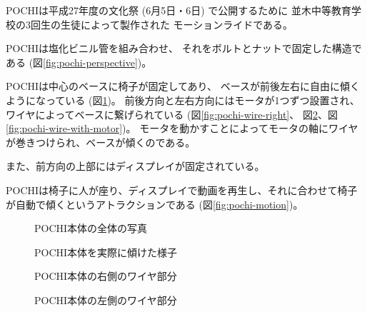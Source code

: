 \def \wrkdir {p.pochi/}

 \label{pa:pochi}
POCHIは平成27年度の文化祭 (6月5日・6日) で公開するために
並木中等教育学校の3回生の生徒によって製作された
モーションライドである。

POCHIは塩化ビニル管を組み合わせ、
それをボルトとナットで固定した構造である (図\ref{fig:pochi-perspective})。

POCHIは中心のベースに椅子が固定してあり、
ベースが前後左右に自由に傾くようになっている (図\ref{fig:pochi-tilt})。
前後方向と左右方向にはモータが1つずつ設置され、
ワイヤによってベースに繋げられている (図\ref{fig:pochi-wire-right}、
図\ref{fig:pochi-wire-left}、図\ref{fig:pochi-wire-with-motor})。
モータを動かすことによってモータの軸にワイヤが巻きつけられ、ベースが傾くのである。

また、前方向の上部にはディスプレイが固定されている。

POCHIは椅子に人が座り、ディスプレイで動画を再生し、それに合わせて椅子が自動で傾くというアトラクションである
(図\ref{fig:pochi-motion})。

\begin{figure}[H]
\centering
\begin{minipage}{0.45\linewidth}
\caption{POCHI本体の全体の写真}
\label{fig:pochi-perspective}
\end{minipage}
\begin{minipage}{0.45\linewidth}
\caption{POCHI本体を実際に傾けた様子}
\label{fig:pochi-tilt}
\end{minipage}
\end{figure}

\begin{figure}[H]
\centering
\begin{minipage}{0.45\linewidth}
\caption{POCHI本体の右側のワイヤ部分}
\label{fig:pochi-wire-right}
\end{minipage}
\begin{minipage}{0.45\linewidth}
\caption{POCHI本体の左側のワイヤ部分}
\label{fig:pochi-wire-left}
\end{minipage}
\end{figure}

